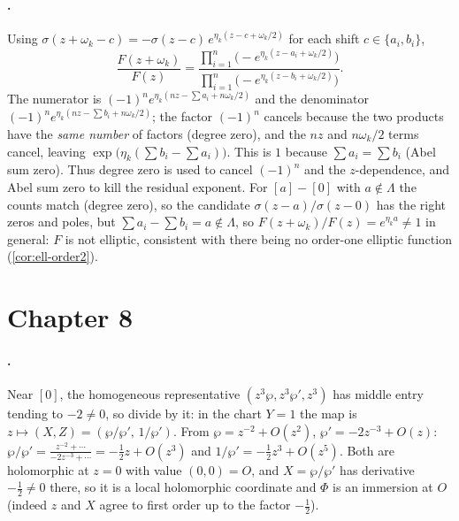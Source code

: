 \paragraph{.}
Using \(\sigma(z+\omega_k - c) = -\sigma(z-c)\,e^{\eta_k(z - c + \omega_k/2)}\) for
each shift \(c \in \{a_i, b_i\}\),
\[
  \frac{F(z+\omega_k)}{F(z)}
  = \frac{\prod_{i=1}^n\bigl(-e^{\eta_k(z - a_i + \omega_k/2)}\bigr)}
         {\prod_{i=1}^n\bigl(-e^{\eta_k(z - b_i + \omega_k/2)}\bigr)} .
\]
The numerator is \((-1)^n e^{\eta_k(nz - \sum a_i + n\omega_k/2)}\) and the
denominator \((-1)^n e^{\eta_k(nz - \sum b_i + n\omega_k/2)}\); the factor
\((-1)^n\) cancels because the two products have the \emph{same number} of factors
(degree zero), and the \(nz\) and \(n\omega_k/2\) terms cancel, leaving
\(\exp\!\bigl(\eta_k(\sum b_i - \sum a_i)\bigr)\). This is \(1\) because
\(\sum a_i = \sum b_i\) (Abel sum zero). Thus degree zero is used to cancel
\((-1)^n\) and the \(z\)-dependence, and Abel sum zero to kill the residual
exponent. For \([a] - [0]\) with \(a \notin \Lambda\) the counts match (degree
zero), so the candidate \(\sigma(z-a)/\sigma(z-0)\) has the right zeros and poles,
but \(\sum a_i - \sum b_i = a \notin \Lambda\), so \(F(z+\omega_k)/F(z) =
e^{\eta_k a} \neq 1\) in general: \(F\) is not elliptic, consistent with there
being no order-one elliptic function (\cref{cor:ell-order2}).

\section{Chapter 8}
\label{sec:soln-ch8}

\paragraph{.}
Near \([0]\), the homogeneous representative \((z^3\wp, z^3\wp', z^3)\) has middle
entry tending to \(-2 \ne 0\), so divide by it: in the chart \(Y = 1\) the map is
\(z \mapsto (X, Z) = (\wp/\wp',\, 1/\wp')\). From \(\wp = z^{-2} + O(z^2)\),
\(\wp' = -2z^{-3} + O(z)\): \(\wp/\wp' = \frac{z^{-2} + \cdots}{-2z^{-3} + \cdots}
= -\tfrac12 z + O(z^3)\) and \(1/\wp' = -\tfrac12 z^3 + O(z^5)\). Both are
holomorphic at \(z = 0\) with value \((0,0) = O\), and \(X = \wp/\wp'\) has
derivative \(-\tfrac12 \ne 0\) there, so it is a local holomorphic coordinate and
\(\Phi\) is an immersion at \(O\) (indeed \(z\) and \(X\) agree to first order up
to the factor \(-\tfrac12\)).


